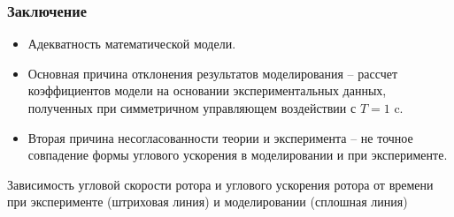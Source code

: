 \begin{frame}
\frametitle{Заключение}
\begin{itemize}
	\item Адекватность математической модели.
	\item Основная причина отклонения результатов моделирования -- рассчет коэффициентов модели на основании экспериментальных  данных, полученных при симметричном управляющем воздействии с $T = 1 $ c.
	\item Вторая причина несогласованности теории и эксперимента -- не точное совпадение формы углового ускорения в моделировании и при эксперименте.
\end{itemize}

Зависимость угловой скорости ротора и углового ускорения ротора от времени при эксперименте (штриховая линия) и моделировании (сплошная линия)

\begin{minipage}[t]{0.47\linewidth}
\end{minipage}
\hfill
\begin{minipage}[t]{0.47\linewidth}
\end{minipage}

\end{frame}

